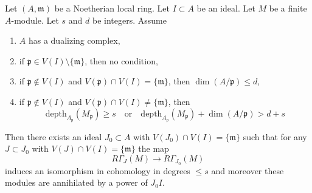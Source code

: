 \begin{lemma}
\label{lemma-kill-colimit-weak}
Let $(A, \mathfrak m)$ be a Noetherian local ring.
Let $I \subset A$ be an ideal. Let $M$ be a finite $A$-module.
Let $s$ and $d$ be integers. Assume
\begin{enumerate}
\item $A$ has a dualizing complex,
\item if $\mathfrak p \in V(I) \setminus \{\mathfrak m\}$, then no condition,
\item if $\mathfrak p \not \in V(I)$ and
$V(\mathfrak p) \cap V(I) = \{\mathfrak m\}$, then
$\dim(A/\mathfrak p) \leq d$,
\item if $\mathfrak p \not \in V(I)$ and
$V(\mathfrak p) \cap V(I) \not = \{\mathfrak m\}$, then
$$
\text{depth}_{A_\mathfrak p}(M_\mathfrak p) \geq s
\quad\text{or}\quad
\text{depth}_{A_\mathfrak p}(M_\mathfrak p) + \dim(A/\mathfrak p) > d + s
$$
\end{enumerate}
Then there exists an ideal $J_0 \subset A$ with
$V(J_0) \cap V(I) = \{\mathfrak m\}$ such that for any $J \subset J_0$ with
$V(J) \cap V(I) = \{\mathfrak m\}$ the map
$$
R\Gamma_J(M) \longrightarrow R\Gamma_{J_0}(M)
$$
induces an isomorphism in cohomology in degrees $\leq s$
and moreover these modules are annihilated by a power of $J_0I$.
\end{lemma}


